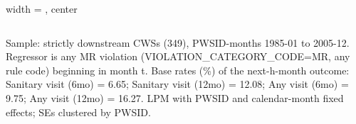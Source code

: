 \begin{table}[htbp]
\begin{adjustbox}{width = \textwidth, center}
\begin{tabular}{lcccc}
         \bottomrule
         
      \end{tabular}
      
      
      
   \end{adjustbox}
      {\tiny\linespread{1}\selectfont \par \raggedright 
   Sample: strictly downstream CWSs (349), PWSID-months 1985-01 to 2005-12. Regressor is any MR violation (VIOLATION\_CATEGORY\_CODE=MR, any rule code) beginning in month t. Base rates (\%) of the next-h-month outcome: Sanitary visit (6mo) = 6.65; Sanitary visit (12mo) = 12.08; Any visit (6mo) = 9.75; Any visit (12mo) = 16.27. LPM with PWSID and calendar-month fixed effects; SEs clustered by PWSID.}
   
\end{table}


